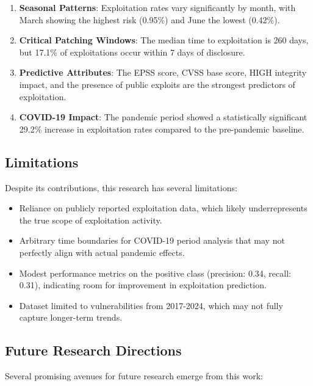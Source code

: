 \documentclass[runningheads]{llncs}
\begin{document}
\begin{enumerate}
    \item \textbf{Seasonal Patterns}: Exploitation rates vary significantly by month, with March showing the highest risk (0.95\%) and June the lowest (0.42\%).
    
    \item \textbf{Critical Patching Windows}: The median time to exploitation is 260 days, but 17.1\% of exploitations occur within 7 days of disclosure.
    
    \item \textbf{Predictive Attributes}: The EPSS score, CVSS base score, HIGH integrity impact, and the presence of public exploits are the strongest predictors of exploitation.
    
    \item \textbf{COVID-19 Impact}: The pandemic period showed a statistically significant 29.2\% increase in exploitation rates compared to the pre-pandemic baseline.
\end{enumerate}

\subsection{Limitations}
Despite its contributions, this research has several limitations:

\begin{itemize}
    \item Reliance on publicly reported exploitation data, which likely underrepresents the true scope of exploitation activity.
    \item Arbitrary time boundaries for COVID-19 period analysis that may not perfectly align with actual pandemic effects.
    \item Modest performance metrics on the positive class (precision: 0.34, recall: 0.31), indicating room for improvement in exploitation prediction.
    \item Dataset limited to vulnerabilities from 2017-2024, which may not fully capture longer-term trends.
\end{itemize}

\subsection{Future Research Directions}
Several promising avenues for future research emerge from this work:
\end{document}
